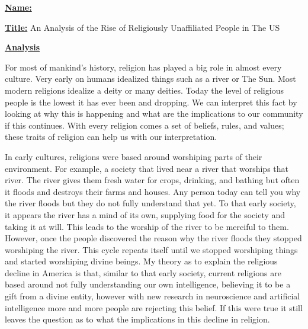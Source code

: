 \documentclass{article}
\author{Ryan Bruno}
\date{\today}
\renewcommand{\maketitle}{
\textbf{\underline{Name:}}
\theauthor

\textbf{\underline{Title:}}
An Analysis of the Rise of Religiously Unaffiliated People in The US
}
\begin{document}
\maketitle

\textbf{\underline{Analysis}}

\setlength{\parindent}{10ex}
For most of mankind’s history, religion has played a big role in almost every culture. Very early on humans idealized things such as a river or The Sun. Most modern religions idealize a deity or many deities. Today the level of religious people is the lowest it has ever been and dropping. We can interpret this fact by looking at why this is happening and what are the implications to our community if this continues. With every religion comes a set of beliefs, rules, and values; these traits of religion can help us with our interpretation. 

In early cultures, religions were based around worshiping parts of their environment. For example, a society that lived near a river that worships that river. The river gives them fresh water for crops, drinking, and bathing but often it floods and destroys their farms and houses. Any person today can tell you why the river floods but they do not fully understand that yet. To that early society, it appears the river has a mind of its own, supplying food for the society and taking it at will. This leads to the worship of the river to be merciful to them. However, once the people discovered the reason why the river floods they stopped worshiping the river. This cycle repeats itself until we stopped worshiping things and started worshiping divine beings. My theory as to explain the religious decline in America is that, similar to that early society, current religions are based around not fully understanding our own intelligence, believing it to be a gift from a divine entity, however with new research in neuroscience and artificial intelligence more and more people are rejecting this belief. If this were true it still leaves the question as to what the implications in this decline in religion.
\end{document}
